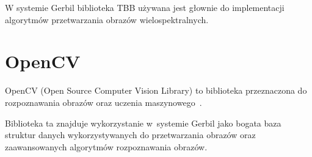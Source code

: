 W systemie Gerbil biblioteka TBB używana jest głownie do implementacji algorytmów przetwarzania obrazów wielospektralnych.

 \section{OpenCV}
OpenCV (Open Source Computer Vision Library) to biblioteka przeznaczona do rozpoznawania obrazów oraz uczenia maszynowego~\cite{opencv}.

Biblioteka ta znajduje wykorzystanie w~systemie Gerbil jako bogata baza struktur danych wykorzystywanych do przetwarzania obrazów oraz zaawansowanych algorytmów rozpoznawania obrazów.